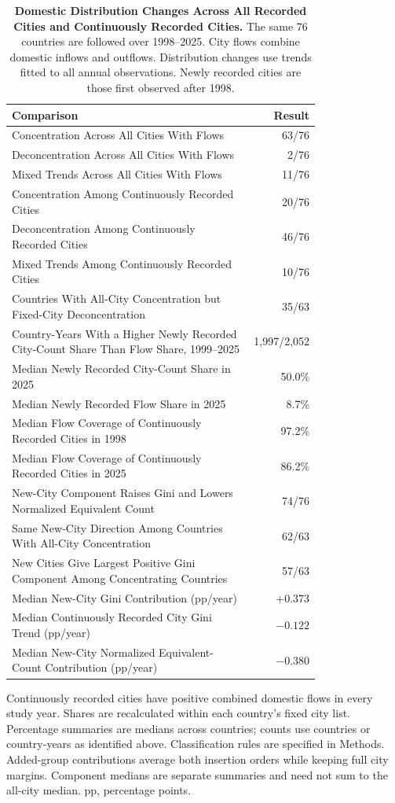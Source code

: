 \begin{table}[!htbp]
\centering
\caption{\textbf{Domestic Distribution Changes Across All Recorded Cities and Continuously Recorded Cities.} The same 76 countries are followed over 1998--2025. City flows combine domestic inflows and outflows. Distribution changes use trends fitted to all annual observations. Newly recorded cities are those first observed after 1998.}
\label{tab:domestic_city_comparison}
\small
\begin{tabular}{p{0.78\linewidth}r}
\hline
Comparison & Result \\
\hline
Concentration Across All Cities With Flows & 63/76 \\
Deconcentration Across All Cities With Flows & 2/76 \\
Mixed Trends Across All Cities With Flows & 11/76 \\
Concentration Among Continuously Recorded Cities & 20/76 \\
Deconcentration Among Continuously Recorded Cities & 46/76 \\
Mixed Trends Among Continuously Recorded Cities & 10/76 \\
Countries With All-City Concentration but Fixed-City Deconcentration & 35/63 \\
Country-Years With a Higher Newly Recorded City-Count Share Than Flow Share, 1999--2025 & 1,997/2,052 \\
Median Newly Recorded City-Count Share in 2025 & 50.0\% \\
Median Newly Recorded Flow Share in 2025 & 8.7\% \\
Median Flow Coverage of Continuously Recorded Cities in 1998 & 97.2\% \\
Median Flow Coverage of Continuously Recorded Cities in 2025 & 86.2\% \\

New-City Component Raises Gini and Lowers Normalized Equivalent Count & 74/76 \\
Same New-City Direction Among Countries With All-City Concentration & 62/63 \\
New Cities Give Largest Positive Gini Component Among Concentrating Countries & 57/63 \\
Median New-City Gini Contribution (pp/year) & +0.373 \\
Median Continuously Recorded City Gini Trend (pp/year) & $-0.122$ \\
Median New-City Normalized Equivalent-Count Contribution (pp/year) & $-0.380$ \\
\hline
\end{tabular}

\medskip
\parbox{\linewidth}{\footnotesize Continuously recorded cities have positive combined domestic flows in every study year. Shares are recalculated within each country's fixed city list. Percentage summaries are medians across countries; counts use countries or country-years as identified above. Classification rules are specified in Methods. Added-group contributions average both insertion orders while keeping full city margins. Component medians are separate summaries and need not sum to the all-city median. pp, percentage points.}
\end{table}


